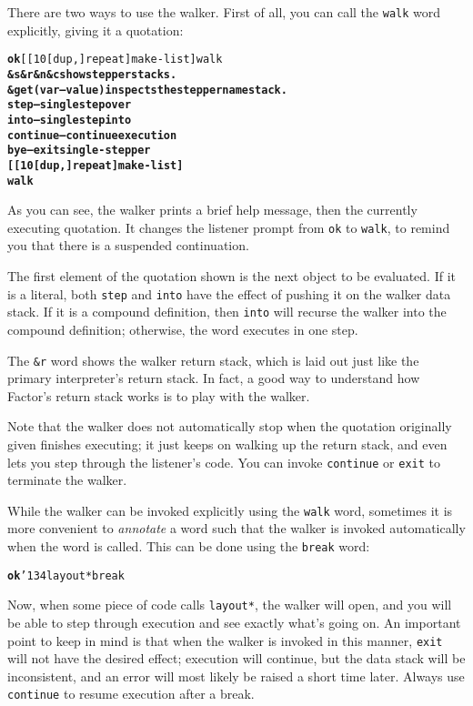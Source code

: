 \documentclass{book}
\newcommand{\bs}{\char'134}
\begin{document}
There are two ways to use the walker. First of all, you can call the \texttt{walk} word explicitly, giving it a quotation:

\begin{alltt}
\textbf{ok} [ [ 10 [ dup , ] repeat ] make-list ] walk
\textbf{\&s \&r \&n \&c show stepper stacks.
\&get ( var -- value ) inspects the stepper namestack.
step -- single step over
into -- single step into
continue -- continue execution
bye -- exit single-stepper
[ [ 10 [ dup , ] repeat ] make-list ]
walk}
\end{alltt}

As you can see, the walker prints a brief help message, then the currently executing quotation. It changes the listener prompt from \texttt{ok} to \texttt{walk}, to remind you that there is a suspended continuation.

The first element of the quotation shown is the next object to be evaluated. If it is a literal, both \texttt{step} and \texttt{into} have the effect of pushing it on the walker data stack. If it is a compound definition, then \texttt{into} will recurse the walker into the compound definition; otherwise, the word executes in one step.

The \texttt{\&r} word shows the walker return stack, which is laid out just like the primary interpreter's return stack. In fact, a good way to understand how Factor's return stack works is to play with the walker.

Note that the walker does not automatically stop when the quotation originally given finishes executing; it just keeps on walking up the return stack, and even lets you step through the listener's code. You can invoke \texttt{continue} or \texttt{exit} to terminate the walker.

While the walker can be invoked explicitly using the \texttt{walk} word, sometimes it is more convenient to \emph{annotate} a word such that the walker is invoked automatically when the word is called. This can be done using the \texttt{break} word:

\begin{alltt}
\textbf{ok} \bs layout* break
\end{alltt}

Now, when some piece of code calls \texttt{layout*}, the walker will open, and you will be able to step through execution and see exactly what's going on. An important point to keep in mind is that when the walker is invoked in this manner, \texttt{exit} will not have the desired effect; execution will continue, but the data stack will be inconsistent, and an error will most likely be raised a short time later. Always use \texttt{continue} to resume execution after a break.
\end{document}
